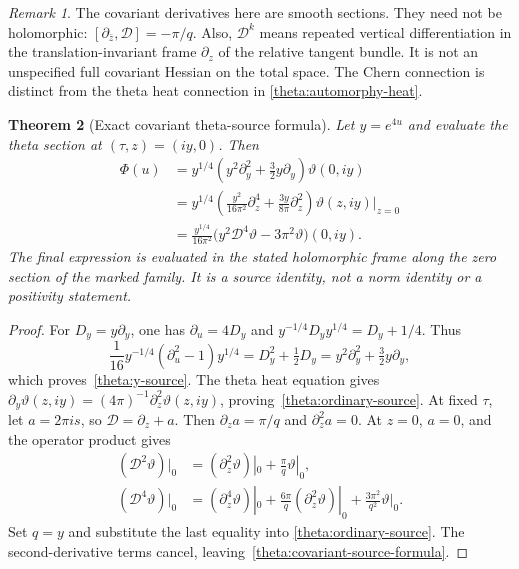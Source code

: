 \documentclass[11pt]{article}
\numberwithin{equation}{section}
\newtheorem{theorem}{Theorem}[section]
\theoremstyle{definition}
\theoremstyle{remark}
\newtheorem{remark}[theorem]{Remark}
\begin{document}
\begin{remark}
The covariant derivatives here are smooth sections.  They need not be
holomorphic: $[\partial_{\bar z},\mathcal D]=-\pi/q$.
Also, $\mathcal D^k$ means repeated vertical differentiation in the
translation-invariant frame $\partial_z$ of the relative tangent bundle.
It is not an unspecified full covariant Hessian on the total space.
The Chern connection is distinct from the theta heat connection in
\eqref{theta:automorphy-heat}.
\end{remark}

\begin{theorem}[Exact covariant theta-source formula]
\label{theta:covariant-source}
Let $y=e^{4u}$ and evaluate the theta section at $(\tau,z)=(iy,0)$.
Then
\begin{align}
 \Phi(u)
 &=y^{1/4}\left(y^2\partial_y^2+\frac32y\partial_y\right)
                      \vartheta(0,iy) \label{theta:y-source}\\
 &=y^{1/4}\left(\frac{y^2}{16\pi^2}\partial_z^4
                  +\frac{3y}{8\pi}\partial_z^2\right)
                      \vartheta(z,iy)\big|_{z=0} \label{theta:ordinary-source}\\
 &=\boxed{\displaystyle
   \frac{y^{1/4}}{16\pi^2}
      \bigl(y^2\mathcal D^4\vartheta-3\pi^2\vartheta\bigr)(0,iy).}
                      \label{theta:covariant-source-formula}
\end{align}
The final expression is evaluated in the stated holomorphic frame along
the zero section of the marked family.  It is a source identity, not a
norm identity or a positivity statement.
\end{theorem}

\begin{proof}
For $D_y=y\partial_y$, one has $\partial_u=4D_y$ and
$y^{-1/4}D_y y^{1/4}=D_y+1/4$.  Thus
\[
 \frac1{16}y^{-1/4}(\partial_u^2-1)y^{1/4}
       =D_y^2+\tfrac12D_y
       =y^2\partial_y^2+\tfrac32y\partial_y,
\]
which proves~\eqref{theta:y-source}.  The theta heat equation gives
$\partial_y\vartheta(z,iy)=(4\pi)^{-1}\partial_z^2\vartheta(z,iy)$,
proving~\eqref{theta:ordinary-source}.
At fixed $\tau$, let $a=2\pi is$, so $\mathcal D=\partial_z+a$.
Then $\partial_z a=\pi/q$ and $\partial_z^2a=0$.  At $z=0$, $a=0$,
and the operator product gives
\begin{align*}
 (\mathcal D^2\vartheta)|_0
   &=(\partial_z^2\vartheta)|_0+\frac\pi q\vartheta|_0,\\
 (\mathcal D^4\vartheta)|_0
   &=(\partial_z^4\vartheta)|_0
     +\frac{6\pi}{q}(\partial_z^2\vartheta)|_0
     +\frac{3\pi^2}{q^2}\vartheta|_0.
\end{align*}
Set $q=y$ and substitute the last equality into
\eqref{theta:ordinary-source}.  The second-derivative terms cancel,
leaving~\eqref{theta:covariant-source-formula}.
\end{proof}
\end{document}
